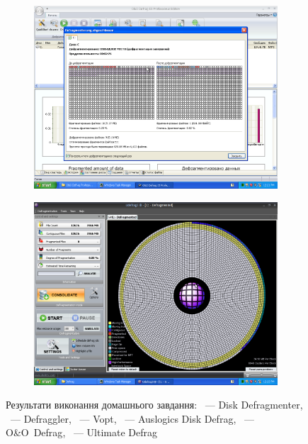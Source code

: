 \documentclass[
	a4paper,
	oneside,
	DIV = 12,
	fontsize = 13pt,
	headings = normal,
]{scrartcl}
\begin{document}
\begin{figure}[!htbp]
			\begin{subfigure}{0.5\textwidth}
				\centering
				\includegraphics[height = 8\baselineskip]{./assets/lab-02-hw-05.png}
				\caption{}
				\label{subfig:homework-05}
			\end{subfigure}%
			\begin{subfigure}{0.5\textwidth}
				\centering
				\includegraphics[height = 8\baselineskip]{./assets/lab-02-hw-06.png}
				\caption{}
				\label{subfig:homework-06}
			\end{subfigure}%
			\caption{Результати виконання домашнього завдання: ~— \textenglish{Disk Defragmenter}, ~— \textenglish{Defraggler}, ~— \textenglish{Vopt}, ~— \textenglish{Auslogics Disk Defrag}, ~— \textenglish{O\&O~Defrag}, ~— \textenglish{Ultimate Defrag}}
			\label{fig:homework}
		\end{figure}
\end{document}
